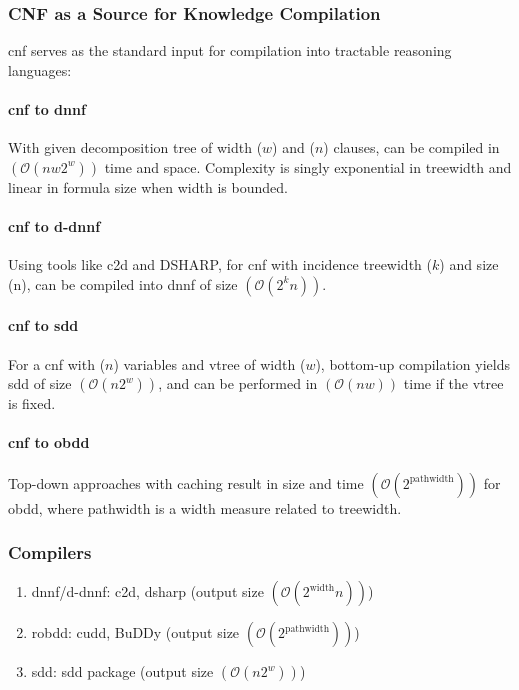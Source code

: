 \subsubsection{CNF as a Source for Knowledge Compilation}
\acrshort{cnf} serves as the standard input for compilation into tractable reasoning languages:

\paragraph{\acrshort{cnf} to \acrshort{dnnf}}
With given decomposition tree of width ($w$) and ($n$) clauses, can be compiled in $(\mathcal{O}(nw2^w))$ time and space. Complexity is singly exponential in treewidth and linear in formula size when width is bounded.

\paragraph{\acrshort{cnf} to \acrshort{d-dnnf}}
Using tools like c2d and DSHARP, for \acrshort{cnf} with incidence treewidth ($k$) and size (n), can be compiled into \acrshort{dnnf} of size $(\mathcal{O}(2^k n))$.

\paragraph{\acrshort{cnf} to \acrshort{sdd}}
For a \acrshort{cnf} with ($n$) variables and vtree of width ($w$), bottom-up compilation yields \acrshort{sdd} of size $(\mathcal{O}(n2^{w}))$, and can be performed in $(\mathcal{O}(nw))$ time if the vtree is fixed.

\paragraph{\acrshort{cnf} to \acrshort{obdd}}
Top-down approaches with caching result in size and time $(\mathcal{O}(2^{\text{pathwidth}}))$ for \acrshort{obdd}, where pathwidth is a width measure related to treewidth.

\subsubsection{Compilers}
\begin{enumerate}
    \item \acrshort{dnnf}/\acrshort{d-dnnf}: c2d, dsharp (output size $(\mathcal{O}(2^{\text{width}} n))$)
    \item \acrshort{robdd}: \acrshort{cudd}, BuDDy (output size $(\mathcal{O}(2^{\text{pathwidth}}))$)
    \item \acrshort{sdd}: \acrshort{sdd} package (output size $(\mathcal{O}(n2^{w}))$)
\end{enumerate}